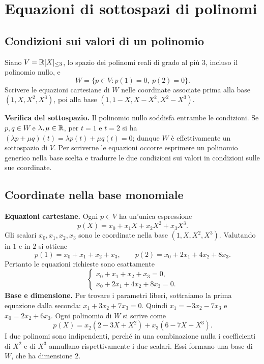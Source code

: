 
\section{Equazioni di sottospazi di polinomi}

\subsection{Condizioni sui valori di un polinomio}
\begin{esercizio}
Siano $V=\mathbb{R}[X]_{\leq3}$, lo spazio dei polinomi reali di grado al più $3$, incluso il polinomio nullo, e
\[
  W=\{p\in V:p(1)=0,\ p(2)=0\}.
\]
Scrivere le equazioni cartesiane di $W$ nelle coordinate associate prima alla base $(1,X,X^2,X^3)$, poi alla base $(1,1-X,X-X^2,X^2-X^3)$.
\end{esercizio}

\begin{svolgimento}
\textbf{Verifica del sottospazio.} Il polinomio nullo soddisfa entrambe le condizioni. Se $p,q\in W$ e $\lambda,\mu\in\mathbb{R}$, per $t=1$ e $t=2$ si ha $(\lambda p+\mu q)(t)=\lambda p(t)+\mu q(t)=0$; dunque $W$ è effettivamente un sottospazio di $V$. Per scriverne le equazioni occorre esprimere un polinomio generico nella base scelta e tradurre le due condizioni sui valori in condizioni sulle sue coordinate.
\end{svolgimento}

\subsection{Coordinate nella base monomiale}
\begin{svolgimento}
\textbf{Equazioni cartesiane.} Ogni $p\in V$ ha un'unica espressione
\[
  p(X)=x_0+x_1X+x_2X^2+x_3X^3.
\]
Gli scalari $x_0,x_1,x_2,x_3$ sono le coordinate nella base $(1,X,X^2,X^3)$. Valutando in $1$ e in $2$ si ottiene
\[
  p(1)=x_0+x_1+x_2+x_3,\qquad
  p(2)=x_0+2x_1+4x_2+8x_3.
\]
Pertanto le equazioni richieste sono esattamente
\[
  \begin{cases}
    x_0+x_1+x_2+x_3=0,\\
    x_0+2x_1+4x_2+8x_3=0.
  \end{cases}
\]
\textbf{Base e dimensione.} Per trovare i parametri liberi, sottraiamo la prima equazione dalla seconda: $x_1+3x_2+7x_3=0$. Quindi $x_1=-3x_2-7x_3$ e $x_0=2x_2+6x_3$. Ogni polinomio di $W$ si scrive come
\[
  p(X)=x_2(2-3X+X^2)+x_3(6-7X+X^3).
\]
I due polinomi sono indipendenti, perché in una combinazione nulla i coefficienti di $X^2$ e di $X^3$ annullano rispettivamente i due scalari. Essi formano una base di $W$, che ha dimensione $2$.
\end{svolgimento}

